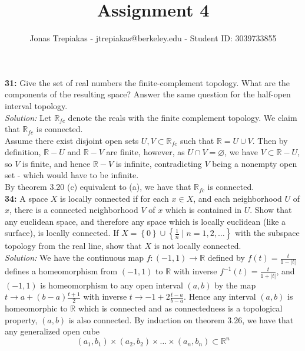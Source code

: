 \documentclass[a4paper]{article}
\title{Assignment 4}
\author{Jonas Trepiakas - jtrepiakas@berkeley.edu - Student ID: 3039733855}
\date{}
\begin{document}
\maketitle
\newpage
    \textbf{31:} Give the set of real numbers the finite-complement topology.
    What are the components of the resulting space? Answer the same question
    for the half-open interval topology.\\
    \linebreak
    \textit{Solution:} Let $\mathbb{R}_{fc}$ denote the reals with the finite
    complement topology. We claim that $\mathbb{R}_{fc}$ is connected.\\
    Assume there exist disjoint open sets $U,V \subset \mathbb{R}_{fc}$ such
    that
    $\mathbb{R} = U \cup V$. Then by definition, 
    $\mathbb{R}-U$ and $\mathbb{R}-V$ are finite, however, as $U \cap
    V = \varnothing$,
    we have $V \subset \mathbb{R}-U$, so $V$ is finite, and hence
    $\mathbb{R} - V$ is infinite, contradicting $V$ being a nonempty open set
    - which would have to be infinite.\\
    By theorem 3.20 (c) equivalent to (a), we have that $\mathbb{R}_{fc}$ is
    connected.\\
    \linebreak
    \textbf{34:} A space $X$ is locally connected if for each $x \in X$, and
    each neighborhood $U$ of $x$, there is a connected neighborhood $V$ of $x$ 
    which is contained in $U$. Show that any euclidean space, and therefore any
    space which is locally euclidean (like a surface), is locally connected. If
    $X = \left\{ 0 \right\} \cup 
    \left\{ \frac{1}{n}  \mid n = 1,2,\ldots \right\} $ with the
    subspace topology from the real line, show that $X$ is not locally
    connected.\\
    \linebreak
    \textit{Solution:} We have the continuous map
    $f  \colon (-1,1) \to \mathbb{R}$ defined by
    $f(t) = \frac{t}{1-|t|}$ defines a homeomorphism from $(-1,1)$ to $\mathbb{R}$ 
    with inverse $f^{-1} (t) = \frac{t}{1 + |t|}$, and
    $(-1,1)$ is homeomorphism to any open interval $(a,b)$ by the map
    $t \to a + (b-a) \frac{t+1}{2}$ with inverse
    $t \to -1 + 2 \frac{t-a}{b-a}$. Hence any interval $(a,b)$ is homeomorphic
    to
    $\mathbb{R}$ which is connected and as connectedness is a topological
    property, $(a,b)$ is also connected. 
    By induction on theorem 3.26, we have that
    any generalized open cube
    \[
        (a_1, b_1) \times (a_2, b_2) \times \ldots \times (a_n, b_n) \subset
        \mathbb{R}^{n}
    \] 
\end{document}
